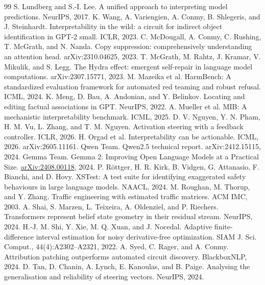 \documentclass[sigconf,10pt,nonacm,balance=false]{acmart}
\begin{document}
\begin{thebibliography}{99}
 S. Lundberg and S.-I. Lee. A unified approach to interpreting model predictions. NeurIPS, 2017.
 K. Wang, A. Variengien, A. Conmy, B. Shlegeris, and J. Steinhardt. Interpretability in the wild: a circuit for indirect object identification in GPT-2 small. ICLR, 2023.
 C. McDougall, A. Conmy, C. Rushing, T. McGrath, and N. Nanda. Copy suppression: comprehensively understanding an attention head. arXiv:2310.04625, 2023.
 T. McGrath, M. Rahtz, J. Kramar, V. Mikulik, and S. Legg. The Hydra effect: emergent self-repair in language model computations. arXiv:2307.15771, 2023.
 M. Mazeika et al. HarmBench: A standardized evaluation framework for automated red teaming and robust refusal. ICML, 2024.
 K. Meng, D. Bau, A. Andonian, and Y. Belinkov. Locating and editing factual associations in GPT. NeurIPS, 2022.
 A. Mueller et al. MIB: A mechanistic interpretability benchmark. ICML, 2025.
 D. V. Nguyen, Y. N. Pham, H. M. Vu, L. Zhang, and T. M. Nguyen. Activation steering with a feedback controller. ICLR, 2026.
 H. Orgad et al. Interpretability can be actionable. ICML, 2026. arXiv:2605.11161.
 Qwen Team. Qwen2.5 technical report. arXiv:2412.15115, 2024.
 Gemma Team. Gemma 2: Improving Open Language Models at a Practical Size. \href{https://arxiv.org/abs/2408.00118}{arXiv:2408.00118}, 2024.
 P. R\"ottger, H. R. Kirk, B. Vidgen, G. Attanasio, F. Bianchi, and D. Hovy. XSTest: A test suite for identifying exaggerated safety behaviours in large language models. NAACL, 2024.
 M. Roughan, M. Thorup, and Y. Zhang. Traffic engineering with estimated traffic matrices. ACM IMC, 2003.
 A. Shai, S. Marzen, L. Teixeira, A. Oldenziel, and P. Riechers. Transformers represent belief state geometry in their residual stream. NeurIPS, 2024.
 H.-J. M. Shi, Y. Xie, M. Q. Xuan, and J. Nocedal. Adaptive finite-difference interval estimation for noisy derivative-free optimization. SIAM J. Sci. Comput., 44(4):A2302--A2321, 2022.
 A. Syed, C. Rager, and A. Conmy. Attribution patching outperforms automated circuit discovery. BlackboxNLP, 2024.
 D. Tan, D. Chanin, A. Lynch, E. Kanoulas, and B. Paige. Analysing the generalisation and reliability of steering vectors. NeurIPS, 2024.

\end{thebibliography}
\end{document}
